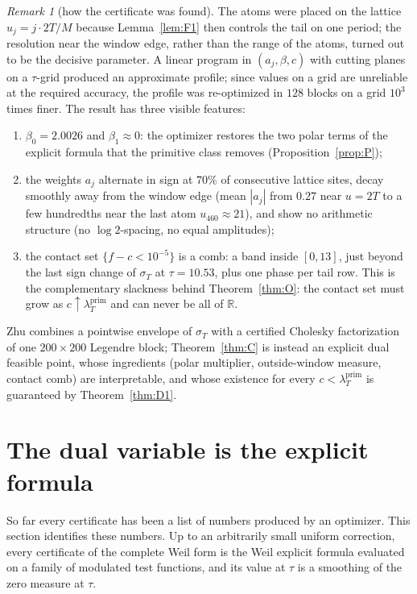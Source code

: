 \documentclass[11pt]{amsart}
\theoremstyle{definition}
\theoremstyle{remark}
\newtheorem{remark}[theorem]{Remark}
\newcommand{\R}{\mathbb R}
\newcommand{\lamP}{\lambda^{\mathrm{prim}}_T}
\newcommand{\sT}{\sigma_T}
\begin{document}
\begin{remark}[how the certificate was found]
The atoms were placed on the lattice $u_j=j\cdot2T/M$ because Lemma~\ref{lem:F1} then controls the
tail on one period; the resolution near the window edge, rather than the range of the atoms, turned
out to be the decisive parameter. A linear program in $(a_j,\beta,c)$ with cutting planes on a
$\tau$-grid produced an approximate profile; since values on a grid are unreliable at the required
accuracy, the profile was re-optimized in $128$ blocks on a grid $10^3$ times finer. The result has three visible features:
\begin{enumerate}
\item $\beta_0=2.0026$ and $\beta_1\approx0$: the optimizer restores the two polar terms of the
explicit formula that the primitive class removes (Proposition~\ref{prop:P});
\item the weights $a_j$ alternate in sign at $70\%$ of consecutive lattice sites, decay smoothly away
from the window edge (mean $|a_j|$ from $0.27$ near $u=2T$ to a few hundredths near the last atom $u_{460}\approx21$), and show no
arithmetic structure (no $\log2$-spacing, no equal amplitudes);
\item the contact set $\{f-c<10^{-5}\}$ is a comb: a band inside $[0,13]$, just beyond the last
sign change of $\sT$ at $\tau=10.53$, plus one phase per tail row. This is the complementary
slackness behind Theorem~\ref{thm:O}: the contact set must grow as $c\uparrow\lamP$ and can never be
all of $\R$.
\end{enumerate}
\end{remark}

Zhu \cite[Thm.~1.2]{Zhu2026} combines a pointwise envelope of $\sT$ with a certified Cholesky
factorization of one $200\times200$ Legendre block; Theorem~\ref{thm:C} is instead an explicit dual
feasible point, whose ingredients (polar multiplier, outside-window measure, contact comb) are
interpretable, and whose existence for every $c<\lamP$ is guaranteed by Theorem~\ref{thm:D1}.


\section{The dual variable is the explicit formula}\label{sec:Z}

So far every certificate has been a list of numbers produced by an optimizer. This section
identifies these numbers. Up to an arbitrarily small uniform correction, every certificate of the
complete Weil form is the Weil explicit formula evaluated on a family of modulated test functions,
and its value at $\tau$ is a smoothing of the zero measure at $\tau$.
\end{document}
